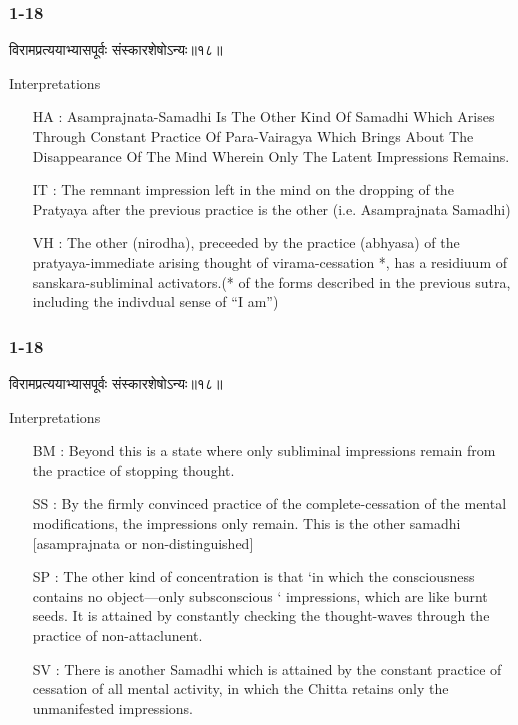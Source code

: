 \begin{frame}[fragile]\frametitle{1-18}
\begin{sanskrit}
विरामप्रत्ययाभ्यासपूर्वः संस्कारशेषोऽन्यः॥१८॥
\end{sanskrit}

Interpretations
\begin{itemize}	
\item [HA]: Asamprajnata-Samadhi Is The Other Kind Of Samadhi Which Arises Through Constant Practice Of Para-Vairagya Which Brings About The Disappearance Of The Mind Wherein Only The Latent Impressions Remains.
\item [IT]: The remnant impression left in the mind on the dropping of the Pratyaya after the previous practice is the other (i.e. Asamprajnata Samadhi)
\item [VH]: The other (nirodha), preceeded by the practice (abhyasa) of the pratyaya-immediate arising thought of virama-cessation *, has a residiuum of sanskara-subliminal activators.(* of the forms described in the previous sutra, including the indivdual sense of “I am”)
\end{itemize}
	
\end{frame}

\begin{frame}[fragile]\frametitle{1-18}
\begin{sanskrit}
विरामप्रत्ययाभ्यासपूर्वः संस्कारशेषोऽन्यः॥१८॥
\end{sanskrit}

Interpretations
\begin{itemize}	
\item [BM]: Beyond this is a state where only subliminal impressions remain from the practice of stopping thought.
\item [SS]: By the firmly convinced practice of the complete-cessation of the mental modifications, the impressions only remain. This is the other samadhi [asamprajnata or non-distinguished]
\item [SP]: The other kind of concentration is that ‘in which the consciousness contains no object—only subsconscious ‘ impressions, which are like burnt seeds. It is attained by constantly checking the thought-waves through the practice of non-attaclunent.
\item [SV]: There is another Samadhi which is attained by the constant practice of cessation of all mental activity, in which the Chitta retains only the unmanifested impressions. 
\end{itemize}
	
\end{frame}


